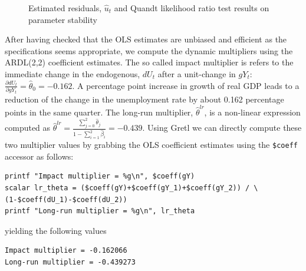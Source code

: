 \documentclass[11pt]{article}
\begin{document}
\begin{figure}[h!]
	\centering
	\caption{Estimated residuals, $ \hat u_t $ and Quandt likelihood ratio test results on parameter stability}
	\label{fig:QLR}
\end{figure}

After having checked that the OLS estimates are unbiased and efficient as the specifications seems appropriate, we compute the dynamic multipliers using the ARDL(2,2) coefficient estimates. The so called impact multiplier is refers to the immediate change in the endogenous, $ dU_t $ after a unit-change in $ gY_t $: $ \frac{\partial dU_t}{\partial gY_t} = \hat \theta_0 = -0.162$. A percentage point increase in growth of real GDP leads to a reduction of the change in the unemployment rate by about 0.162 percentage points in the same quarter. The long-run multiplier, $ \hat \theta^{lr}$, is a non-linear expression computed as $ \hat \theta^{lr} = \frac{\sum_{j=0}^2 \hat \theta_j}{1-\sum_{i=1}^{2} \hat \beta_i} = -0.439$. Using Gretl we can directly compute these two multiplier values by grabbing the OLS coefficient estimates using the \texttt{\$coeff} accessor as follows:

\begin{Verbatim}[baselinestretch=0.75]
printf "Impact multiplier = %g\n", $coeff(gY)
scalar lr_theta = ($coeff(gY)+$coeff(gY_1)+$coeff(gY_2)) / \
(1-$coeff(dU_1)-$coeff(dU_2))
printf "Long-run multiplier = %g\n", lr_theta
\end{Verbatim}
yielding the following values
\begin{Verbatim}[baselinestretch=0.75]
Impact multiplier = -0.162066
Long-run multiplier = -0.439273
\end{Verbatim}
\end{document}
